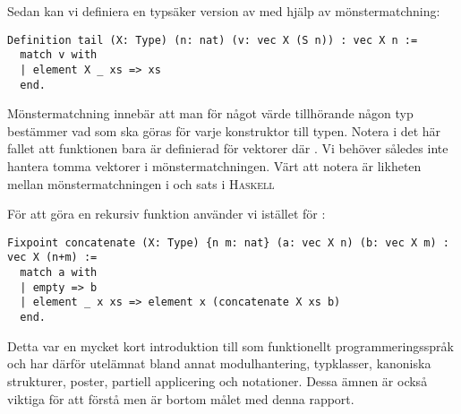 Sedan kan vi definiera en typsäker version av  med hjälp av
mönstermatchning:
\begin{lstlisting}
Definition tail (X: Type) (n: nat) (v: vec X (S n)) : vec X n :=
  match v with
  | element X _ xs => xs
  end.
\end{lstlisting}
Mönstermatchning innebär att man för något värde tillhörande någon typ
bestämmer vad som ska göras för varje konstruktor till typen. Notera i det här
fallet att funktionen bara är definierad för vektorer  där . Vi behöver således inte hantera tomma vektorer i mönstermatchningen.
Värt att notera är likheten mellan mönstermatchningen i \coq{} och 
 sats i \textsc{Haskell}

För att göra en rekursiv funktion använder vi  istället för
:
\begin{lstlisting}
Fixpoint concatenate (X: Type) {n m: nat} (a: vec X n) (b: vec X m) : vec X (n+m) :=
  match a with
  | empty => b
  | element _ x xs => element x (concatenate X xs b)
  end.
\end{lstlisting}

Detta var en mycket kort introduktion till \coq{} som funktionellt
programmeringsspråk och har därför utelämnat bland annat modulhantering,
typklasser, kanoniska strukturer, poster, partiell applicering och notationer.
Dessa ämnen är också viktiga för att förstå \coq{} men är bortom målet med denna
rapport.

